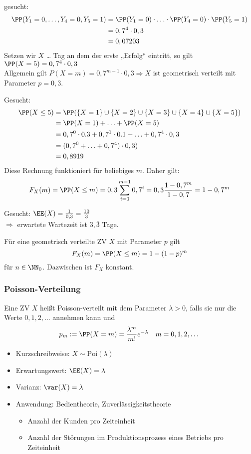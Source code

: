 \begin{anumerate}
\item gesucht: \begin{align*}
\PP(Y_1=0, \ldots, Y_4=0, Y_5=1) &= \PP(Y_1=0) \cdot \ldots \cdot \PP(Y_4=0) \cdot \PP(Y_5=1) \\
&= 0,7 ^4 \cdot 0,3 \\
&= 0,07203
\end{align*}
Setzen wir $X$ … Tag an dem der erste „Erfolg“ eintritt, so gilt $\PP(X=5)=0,7^4\cdot 0,3$\\
Allgemein gilt $P(X=m)=0,7^{m-1}\cdot 0,3 \Rightarrow X$ ist geometrisch verteilt mit Parameter $p=0,3$.
\item Gesucht:
\begin{align*}
\PP(X\leq 5)&=\PP(\{X=1\}\cup \{X=2\} \cup \{X=3\} \cup \{X=4\} \cup \{X=5\}) \\
&= \PP(X=1) + \ldots + \PP(X=5) \\
&= 0,7^0\cdot 0.3 + 0,7^1 \cdot 0.1 + \ldots + 0,7^4 \cdot 0,3 \\
&= (0,7^0+\ldots+0,7^4)\cdot 0,3 ) \\
&= 0,8919
\end{align*}
Diese Rechnung funktioniert für beliebiges $m$. Daher gilt: 
$$F_X(m)=\PP(X\leq m) = 0,3 \sum_{i=0}^{m-1}0,7^i=0,3 \frac{1-0,7^m}{1-0,7}=1-0,7^m$$
\item Gesucht: $\EE(X)=\frac{1}{0,3}=\frac{10}{3}$\\
$\Rightarrow$ erwartete Wartezeit ist $3,\bar{3}$ Tage.
\end{anumerate}

 Für eine geometrisch verteilte ZV $X$ mit Parameter $p$ gilt 
$$F_X(m)=\PP(X\leq m) = 1-(1-p)^m$$
für $n \in \NN_0$. Dazwischen ist $F_X$ konstant.

\subsubsection{Poisson-Verteilung}
 Eine ZV $X$ heißt Poisson-verteilt mit dem Parameter $\lambda >0$, falls sie nur die Werte $0,1,2,\dots$ annehmen kann und 
$$p_m:=\PP(X=m)=\frac{\lambda^m}{m!}e^{-\lambda} \quad m=0,1,2,\dots$$
\begin{itemize}
\item Kurzschreibweise: $X\sim \mathrm{Poi}(\lambda)$
\item Erwartungswert: $\EE(X)=\lambda$
\item Varianz: $\var(X)=\lambda$
\item Anwendung: Bedientheorie, Zuverlässigkeitstheorie
\begin{itemize}
\item Anzahl der Kunden pro Zeiteinheit
\item Anzahl der Störungen im Produktionsprozess eines Betriebs pro Zeiteinheit
\end{itemize}
\end{itemize}

